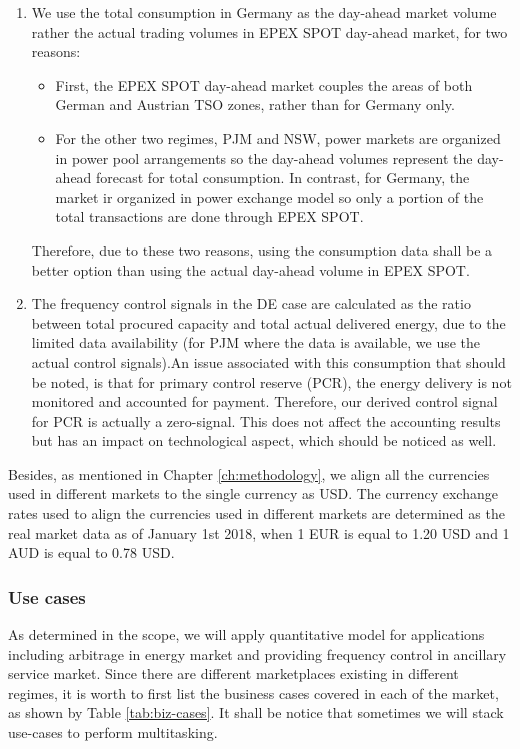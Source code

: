 \begin{enumerate}
	\item We use the total consumption in Germany as the day-ahead market volume rather the actual trading volumes in EPEX SPOT day-ahead market, for two reasons:
	\begin{itemize}
		\item First, the EPEX SPOT day-ahead market couples the areas of both German and Austrian TSO zones, rather than for Germany only.
		\item For the other two regimes, PJM and NSW, power markets are organized in power pool arrangements so the day-ahead volumes represent the day-ahead forecast for total consumption. In contrast, for Germany, the market ir organized in power exchange model so only a portion of the total transactions are done through EPEX SPOT. 
	\end{itemize}
	Therefore, due to these two reasons, using the consumption data shall be a better option than using the actual day-ahead volume in EPEX SPOT.
	\item The frequency control signals in the DE case are calculated as the ratio between total procured capacity and total actual delivered energy, due to the limited data availability (for PJM where the data is available, we use the actual control signals).An issue associated with this consumption that should be noted, is that for primary control reserve (PCR), the energy delivery is not monitored and accounted for payment. Therefore, our derived control signal for PCR is actually a zero-signal. This does not affect the accounting results but has an impact on technological aspect, which should be noticed as well.
\end{enumerate}

Besides, as mentioned in Chapter \ref{ch:methodology}, we align all the currencies used in different markets to the single currency as USD. The currency exchange rates used to align the currencies used in different markets are determined as the real market data as of January 1st 2018, when 1 EUR is equal to 1.20 USD and 1 AUD is equal to 0.78 USD\cite{Bloomberg}.

\subsubsection{Use cases}

As determined in the scope, we will apply quantitative model for applications including arbitrage in energy market and providing frequency control in ancillary service market. Since there are different marketplaces existing in different regimes, it is worth to first list the business cases covered in each of the market, as shown by Table \ref{tab:biz-cases}. It shall be notice that sometimes we will stack use-cases to perform multitasking.

